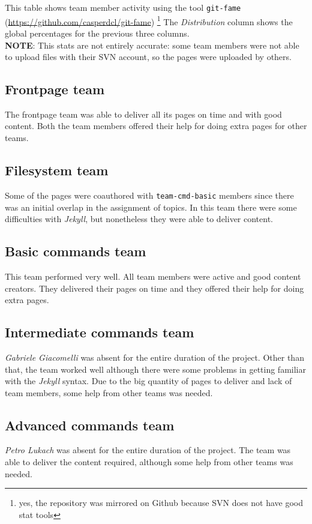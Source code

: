 \documentclass[hidelinks,12pt,a4paper,numbers=enddot]{scrartcl}
\begin{document}
This table shows team member activity using the tool \texttt{git-fame} (\url{https://github.com/casperdcl/git-fame})
\footnote{yes, the repository was mirrored on Github because SVN does not have good stat tools}
The \emph{Distribution} column shows the global percentages for the previous three columns. \\
\textbf{NOTE}: This stats are not entirely accurate: some team members were not able to upload files with their SVN account, so the pages were uploaded by others.

\subsection{Frontpage team}
The frontpage team was able to deliver all its pages on time and with good content. Both the team members offered their
help for doing extra pages for other teams.

\subsection{Filesystem team}
Some of the pages were coauthored with \texttt{team-cmd-basic} members since there was an initial overlap in the
assignment of topics. In this team there were some difficulties with \textit{Jekyll}, but nonetheless they were able
to deliver content.

\subsection{Basic commands team}
This team performed very well. All team members were active and good content creators. They delivered their pages on time
and they offered their help for doing extra pages.

\subsection{Intermediate commands team}
\textit{Gabriele Giacomelli} was absent for the entire duration of the project. Other than that, the team worked well
although there were some problems in getting familiar with the \emph{Jekyll} syntax. Due to the big quantity of pages to
deliver and lack of team members, some help from other teams was needed.

\subsection{Advanced commands team}
\textit{Petro Lukach} was absent for the entire duration of the project. The team was able to deliver the content required,
although some help from other teams was needed.
\end{document}
